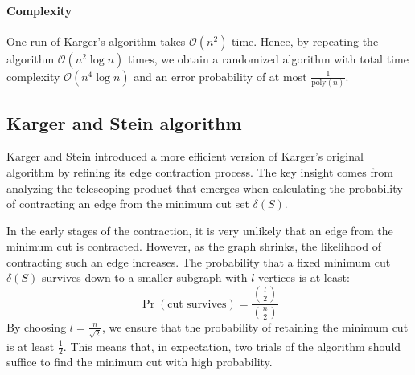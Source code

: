 \paragraph*{Complexity}
One run of Karger's algorithm takes $\mathcal{O}(n^2)$ time.
Hence, by repeating the algorithm $\mathcal{O}(n^2\log n)$ times, we obtain a randomized algorithm with total time complexity $\mathcal{O}(n^4\log n)$ and an error probability of at most $\frac{1}{\text{poly}(n)}$.

\subsection{Karger and Stein algorithm}
Karger and Stein introduced a more efficient version of Karger's original algorithm by refining its edge contraction process.
The key insight comes from analyzing the telescoping product that emerges when calculating the probability of contracting an edge from the minimum cut set $\delta(S)$. 

In the early stages of the contraction, it is very unlikely that an edge from the minimum cut is contracted. 
However, as the graph shrinks, the likelihood of contracting such an edge increases. 
The probability that a fixed minimum cut $\delta(S)$ survives down to a smaller subgraph with $l$ vertices is at least:
\[\Pr(\text{cut survives})=\frac{\binom{l}{2}}{\binom{n}{2}}\]
By choosing $l=\frac{n}{\sqrt{2}}$, we ensure that the probability of retaining the minimum cut is at least $\frac{1}{2}$.
This means that, in expectation, two trials of the algorithm should suffice to find the minimum cut with high probability.

